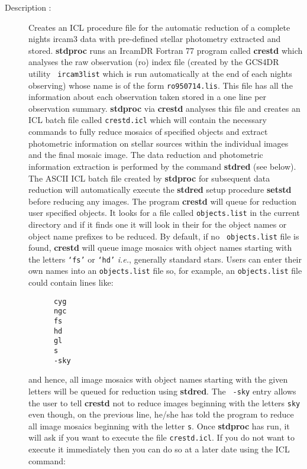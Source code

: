 \begin{description}

\item[Description :] Creates an ICL procedure file for the automatic
reduction of a complete nights {\sc ircam3} data with pre-defined
stellar photometry extracted and stored.  {\bf stdproc} runs an {\sc
IrcamDR} Fortran 77 program called {\bf crestd} which analyses the raw
observation ({\sc ro}) index file (created by the GCS4DR utility {\tt
ircam3list} which is run automatically at the end of each nights
observing) whose name is of the form {\tt ro950714.lis}.  This file has
all the information about each observation taken stored in a one line
per observation summary.  {\bf stdproc} via {\bf crestd} analyses this
file and creates an ICL batch file called {\tt crestd.icl} which will
contain the necessary commands to fully reduce mosaics of specified
objects and extract photometric information on stellar sources within
the individual images and the final mosaic image.  The data reduction
and photometric information extraction is performed by the command {\bf
stdred} (see below).  The ASCII ICL batch file created by {\bf stdproc}
for subsequent data reduction will automatically execute the {\bf
stdred} setup procedure {\bf setstd} before reducing any images.  The
program {\bf crestd} will queue for reduction user specified objects.
It looks for a file called {\tt objects.list} in the current directory
and if it finds one it will look in their for the object names or
object name prefixes to be reduced.  By default, if no {\tt
objects.list} file is found, {\bf crestd} will queue image mosaics with
object names starting with the letters {\tt `fs'} or {\tt `hd'}
\emph{i.e.}, generally standard stars.  Users can enter their own names
into an {\tt objects.list} file so, for example, an {\tt objects.list}
file could contain lines like:

\begin{small}
\begin{verbatim}
      cyg
      ngc
      fs
      hd
      gl
      s
      -sky
\end{verbatim}
\end{small}

and hence, all image mosaics with object names starting with the given
letters will be queued for reduction using {\bf stdred}.  The {\tt
-sky} entry allows the user to tell {\bf crestd} not to reduce images
beginning with the letters {\tt sky} even though, on the previous line,
he/she has told the program to reduce all image mosaics beginning with
the letter {\tt s}.  Once {\bf stdproc} has run, it will ask if you
want to execute the file {\tt crestd.icl}.   If you do not want to
execute it immediately then you can do so at a later date using the ICL
command:


\end{description}

